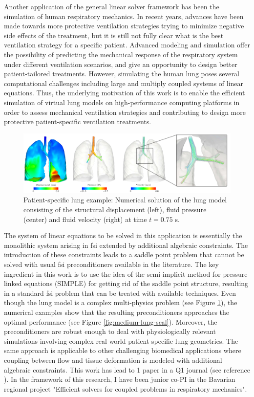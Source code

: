 \documentclass{article}
\newcommand{\bemph}[1]{#1}
\begin{document}
Another application of the general linear solver framework has been the simulation of human respiratory mechanics. In recent years, advances have been made towards more protective ventilation strategies \cite{tobin_2001} trying to minimize negative side effects of the treatment, but it is still not fully clear what is the best ventilation strategy for a specific patient. Advanced modeling and simulation offer the possibility of predicting the mechanical response of the respiratory system under different ventilation scenarios, and give an opportunity to design better patient-tailored treatments. However, simulating the human lung poses several computational challenges including large and multiply coupled systems of linear equations. Thus, the underlying motivation of this work is to enable the efficient simulation of virtual lung models on high-performance computing platforms in order to assess mechanical ventilation strategies and contributing to design more protective patient-specific ventilation treatments.

\begin{figure}[ht!]
\centering
\includegraphics[width=\textwidth]{../_assets/fig15.png}
\caption{Patient-specific lung example: Numerical solution of the lung model consisting of the structural displacement (left), fluid pressure (center) and fluid velocity (right) at time $t=0.75$ s.}
\label{fig:lung-sol}
\end{figure}

The system of linear equations to be solved  in this application is essentially the monolithic system arising in \ac{fsi} extended by additional algebraic constraints. The introduction of these constraints leads to a saddle point problem that cannot be solved with usual \ac{fsi} preconditioners available in the literature. The key ingredient in this work is to use the idea of the semi-implicit method for pressure-linked equations (SIMPLE) for getting rid of the saddle point structure, resulting in a standard \ac{fsi} problem that can be treated with available techniques. Even though the lung model is a complex multi-physics problem (see Figure \ref{fig:lung-sol}), the numerical examples show that the resulting preconditioners approaches the optimal performance (see Figure \ref{fig:medium-lung-scal}). Moreover, the preconditioners are robust enough to deal with physiologically relevant simulations involving complex real-world patient-specific lung geometries. The same approach is applicable to other challenging biomedical applications where coupling between flow and tissue deformation is modeled with additional algebraic constraints. \bemph{This work has lead to 1 paper in a Q1 journal} (see reference \cite{verdugo_2016b}). In the framework of this research, \bemph{I have been junior co-PI in the Bavarian regional project "Efficient solvers for coupled problems in respiratory mechanics"}. 
\end{document}
